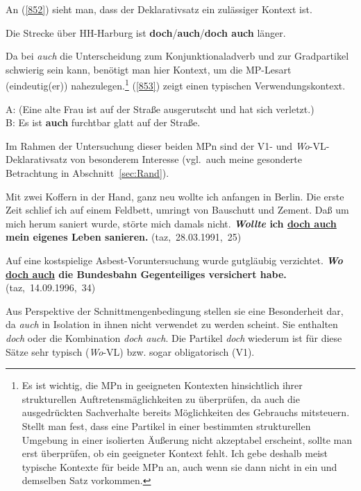 {An (\ref{852}) sieht man, dass der Deklarativsatz ein zulässiger Kontext ist.

\begin{exe}
	\ex\label{852}
	Die Strecke über HH-Harburg ist \textbf{doch}/\textbf{auch}/\textbf{doch auch} länger.
\end{exe}
Da bei \textit{auch} die Unterscheidung zum Konjunktionaladverb  und zur Gradpartikel  schwierig sein kann, benötigt man hier Kontext, um die MP-Lesart (eindeutig(er)) nahezulegen.\footnote{Es ist wichtig, die MPn in geeigneten Kontexten hinsichtlich ihrer strukturellen Auftretensmäglichkeiten zu überprüfen, da auch die ausgedrückten Sachverhalte bereits Möglichkeiten des Gebrauchs mitsteuern. Stellt man fest, dass eine Partikel in einer bestimmten strukturellen Umgebung in einer isolierten Äußerung nicht akzeptabel erscheint, sollte man erst überprüfen, ob ein geeigneter Kontext fehlt. Ich gebe deshalb meist typische Kontexte für beide MPn an, auch wenn sie dann nicht in ein und demselben Satz vorkommen.} (\ref{853}) zeigt einen typischen Verwendungskontext.

\begin{exe}
	\ex\label{853}
	A: (Eine alte Frau ist auf der Straße ausgerutscht und hat sich verletzt.)\\
	B: Es ist \textbf{auch} furchtbar glatt auf der Straße.
	\hfill\hbox{\citet[88]{Helbig1990}}
\end{exe}
Im Rahmen der Untersuchung dieser beiden MPn sind  der V1- und \textit{Wo}-VL-De\-kla\-ra\-tiv\-satz  von besonderem Interesse (vgl.\ auch meine gesonderte Betrachtung in Abschnitt~\ref{sec:Rand}).

\begin{exe}
	\ex\label{854}

	Mit zwei Koffern in der Hand, ganz neu wollte ich anfangen in Berlin. Die erste Zeit schlief ich auf einem Feldbett, umringt von Bauschutt und Zement. 		Daß um mich herum saniert wurde, störte mich damals nicht. \textbf{\textit{Wollte} ich \ul{doch auch} mein eigenes Leben sanieren.}  	
	\hfill\hbox{(taz, 28.03.1991, 25)}
	\newline
	\hbox{}\hfill\hbox{\citet[74--75]{Kwon2005}}
\end{exe}
   
\begin{exe}
	\ex\label{855}

	Auf eine kostspielige Asbest-Voruntersuchung wurde gutgläubig verzichtet. \textbf{\textit{Wo} \ul{doch auch} die Bundesbahn Gegenteiliges 			versichert habe.} 
	\newline\hbox{}\hfill\hbox{(taz, 14.09.1996, 34)}
	\newline
	\hbox{}\hfill\hbox{\citet[75]{Kwon2005}}
\end{exe}  
Aus Perspektive der Schnittmengenbedingung  stellen sie eine Besonderheit dar, da \textit{auch} in Isolation in ihnen nicht verwendet zu werden scheint. Sie enthalten \textit{doch} oder die Kombination \textit{doch auch}. Die Partikel \textit{doch} wiederum ist für diese Sätze sehr typisch (\textit{Wo}-VL) bzw. sogar obligatorisch (V1).\\

}

